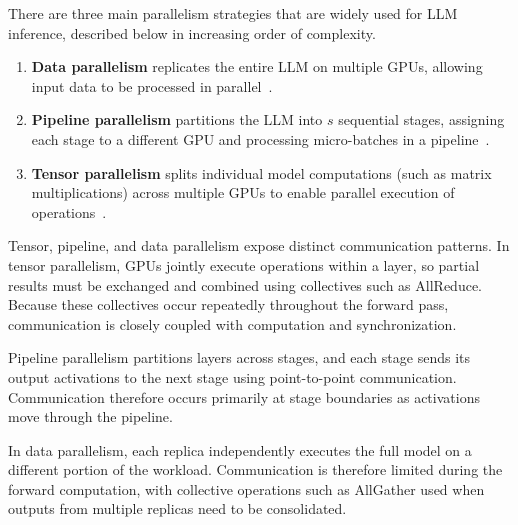 

There are three main parallelism strategies that are widely used for LLM inference, described below in increasing order of complexity.
\begin{enumerate}[leftmargin=*,itemsep=0pt,topsep=0pt]
    \item \textbf{Data parallelism} replicates the entire LLM on multiple GPUs, allowing input data to be processed in parallel~\cite{data-parallel}.
    \item \textbf{Pipeline parallelism} partitions the LLM into $s$ sequential stages, assigning each stage to a different GPU and processing micro-batches in a pipeline~\cite{sangjin23_envpipe}. 
    \item \textbf{Tensor parallelism} splits individual model computations (such as matrix multiplications) across multiple GPUs to enable parallel execution of operations~\cite{megatron}.
\end{enumerate}

\noindent Tensor, pipeline, and data parallelism expose distinct communication patterns. In tensor parallelism, GPUs jointly execute operations within a layer, so partial results must be exchanged and combined using collectives such as AllReduce. Because these collectives occur repeatedly throughout the forward pass, communication is closely coupled with computation and synchronization.

Pipeline parallelism partitions layers across stages, and each stage sends its output activations to the next stage using point-to-point communication. Communication therefore occurs primarily at stage boundaries as activations move through the pipeline.

In data parallelism, each replica independently executes the full model on a different portion of the workload. Communication is therefore limited during the forward computation, with collective operations such as AllGather used when outputs from multiple replicas need to be consolidated.


